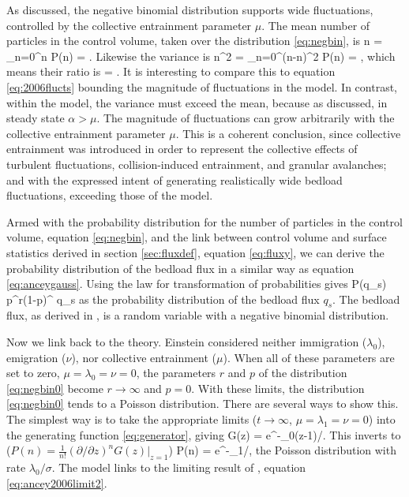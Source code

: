 As discussed, the negative binomial distribution supports wide fluctuations, controlled by the collective entrainment parameter $\mu$. 
The mean number of particles in the control volume, taken over the distribution \ref{eq:negbin}, is 
\be \bra n \ket = \sum_{n=0}^\infty n P(n) = \frac{\lambda \alpha}{\alpha-\mu}. \label{eq:anceymean}\ee
Likewise the variance is 
\be \bra \delta n^2 \ket = \sum_{n=0}^\infty (n-\bra n\ket)^2 P(n) = ,\ee
which means their ratio is 
\be {} = .\ee
It is interesting to compare this to equation \ref{eq:2006flucts} bounding the magnitude of fluctuations in the \citet{Ancey2006} model. 
In contrast, within the \citet{Ancey2008} model, the variance must exceed the mean, because as discussed, in steady state $\alpha>\mu$. 
The magnitude of fluctuations can grow arbitrarily with the collective entrainment parameter $\mu$. 
This is a coherent conclusion, since collective entrainment was introduced in order to represent the collective effects of turbulent fluctuations, collision-induced entrainment, and granular avalanches; and with the expressed intent of generating realistically wide bedload fluctuations, exceeding those of the \citet{Ancey2006} model. 

Armed with the probability distribution for the number of particles in the control volume, equation \ref{eq:negbin}, and the link between control volume and surface statistics derived in section \ref{sec:fluxdef}, equation \ref{eq:fluxy}, we can derive the probability distribution of the bedload flux in a similar way as equation \ref{eq:anceygauss}.
Using the law for transformation of probabilities gives 
\be P(q_s) \approx {}p^r(1-p)^{ q_s}\ee
as the probability distribution of the bedload flux $q_s$.
The bedload flux, as derived in \citet{Ancey2008}, is a random variable with a negative binomial distribution.  

Now we link back to the \citet{Einstein1950} theory. 
Einstein considered neither immigration ($\lambda_0$), emigration ($\nu$), nor collective entrainment ($\mu$). 
When all of these parameters are set to zero, $\mu = \lambda_0 = \nu = 0$, the parameters $r$ and $p$ of the distribution \ref{eq:negbin0} become $r \rightarrow \infty$ and $p=0$. 
With these limits, the distribution \ref{eq:negbin0} tends to a Poisson distribution. 
There are several ways to show this. 
The simplest way is to take the appropriate limits ($t \rightarrow \infty$, $\mu=\lambda_1=\nu= 0$)  into the generating function \ref{eq:generator}, giving
\be G(z) = e^{-\lambda_0(z-1)/\sigma}.\ee
This inverts to ($P(n) = \frac{1}{n!}(\partial/\partial z)^n G(z)|_{z=1}$)
\be P(n) = e^{-\lambda_1/\sigma},\label{eq:anceypoisson}\ee
the Poisson distribution with rate $\lambda_0/\sigma$.
The \citet{Ancey2008} model links to the limiting result of \citet{Ancey2006}, equation \ref{eq:ancey2006limit2}. 

